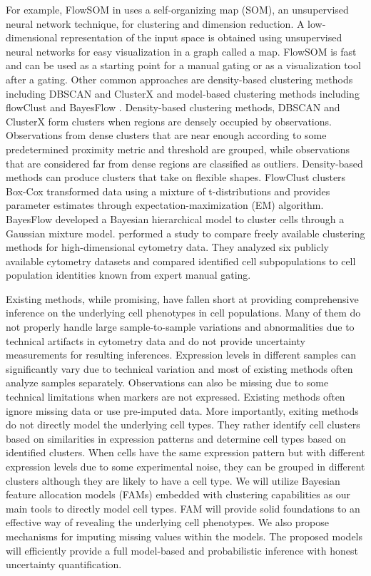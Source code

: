 \documentclass[12pt,]{article}
\begin{document}
For example, FlowSOM in \cite{van2015flowsom} uses a self-organizing map (SOM),
an unsupervised neural network technique, for clustering and dimension
reduction. A low-dimensional representation of the input space is obtained
using unsupervised neural networks for easy visualization in a graph called a
map.  FlowSOM is fast and can be used as a starting point for a manual gating
or as a visualization tool after a gating.  Other common approaches are
density-based clustering methods including DBSCAN \citep{ester1996density} and
ClusterX \citep{chen2016cytofkit} and  model-based clustering methods including
flowClust \citep{lo2009flowclust} and BayesFlow \citep{johnsson2016bayesflow}.
Density-based clustering methods, DBSCAN and ClusterX form clusters when
regions are densely occupied by observations. Observations from dense clusters
that are near enough according to some predetermined proximity metric and
threshold are grouped, while observations that are considered far from dense
regions are classified as outliers. Density-based methods can produce clusters
that take on flexible shapes. FlowClust clusters Box-Cox transformed data using
a mixture of t-distributions and provides parameter estimates through
expectation-maximization (EM) algorithm. BayesFlow developed a Bayesian
hierarchical model to cluster cells through a Gaussian mixture model.
\cite{weber2016comparison} performed a study to compare freely available
clustering methods for high-dimensional cytometry data.  They analyzed six
publicly available cytometry datasets and compared identified cell
subpopulations to cell population identities known from expert manual gating. 


Existing methods, while promising, have fallen short at providing comprehensive inference on the underlying cell phenotypes in cell populations.  Many of them do not properly handle large sample-to-sample variations and abnormalities due to technical artifacts in cytometry data and do not provide uncertainty measurements for resulting inferences.  Expression levels in different samples can significantly vary due to technical variation and most of existing methods often analyze samples separately.  Observations can also be missing due to some technical limitations when markers are not expressed.  Existing methods often ignore missing data or use pre-imputed data.  More importantly, exiting methods do not directly model the underlying cell types.  They rather identify cell clusters based on similarities in expression patterns and determine cell types based on identified clusters. When cells have the same expression pattern but with different expression levels due to some experimental noise, they can be grouped in different clusters although they are likely to have a cell type.  We will utilize Bayesian feature allocation models (FAMs) embedded with clustering
capabilities as our main tools to directly model cell types. FAM will provide solid foundations to an effective way of revealing the underlying cell phenotypes. We also propose mechanisms for imputing missing values within the
models. The proposed models will efficiently provide a full model-based and probabilistic inference with honest uncertainty quantification.
\end{document}
